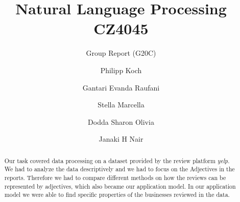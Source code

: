 \documentclass[sigchi]{acmart}
\begin{document}
	
	\title{Natural Language Processing CZ4045}
	\subtitle{Group Report (G20C)}
	
	\author{Philipp Koch}
	
	\author{Gantari Evanda Raufani}
	
	\author{Stella Marcella}
	
	\author{Dodda Sharon Olivia}
	
	\author{Janaki H Nair}
	
	
	\begin{abstract}
		Our task covered data processing on a dataset provided by the review platform \textit{yelp}. We had to analyze the data
		descriptively and we had to focus on the Adjectives in the reports. Therefore we had to compare different methods on how the reviews can be represented by adjectives, which also became our application model. In our application model we were able to find specific properties of the businesses reviewed in the data.
	\end{abstract}
	
\end{document}
